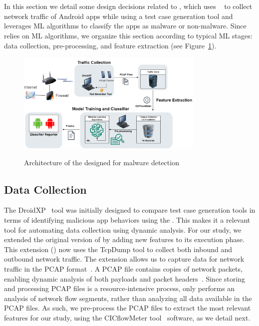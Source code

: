 \section{\droidxpflow}\label{sec:droidxpflow}

In this section we detail some design decisions
related to \droidxpflow, which uses \droidxp~\cite{DBLP:conf/scam/CostaMCMVBC20} to
collect network traffic of Android apps while
using a test case generation tool and leverages
ML algorithms to classify the
apps as malware or non-malware. Since \droidxpflow
relies on ML algorithms, we organize this section
according to typical ML stages: data collection,
pre-processing, and 
feature extraction (see Figure~\ref{fig:arq}).


\begin{figure}[h]
  \centering
  
    \includegraphics[width=0.80\textwidth]{image/archic.png} \\[\abovecaptionskip]
    
  \caption{Architecture of the \droidxpflow designed for malware detection}\label{fig:arq}
\end{figure}

\subsection{Data Collection}

The DroidXP~\cite{DBLP:conf/scam/CostaMCMVBC20} tool was initially designed to compare test case generation tools in terms of identifying malicious app behaviors using the \mas. This makes it a relevant tool for automating data collection using dynamic analysis. For our study, we extended the original version of \droidxp by adding new features to its execution phase. This extension (\droidxpflow) now uses the TcpDump tool
to collect both inbound and outbound network traffic. The \droidxpflow extension allows us to capture data for network traffic in the PCAP format~\cite{DBLP:conf/iv/UhlarHR21}.
A PCAP file contains copies of network packets, enabling dynamic analysis of both payloads and packet headers~\cite{DBLP:conf/iv/UhlarHR21}. Since storing
and processing PCAP files is a resource-intensive process, \droidxpflow only performs an analysis of network flow segments, rather than analyzing all data available in the PCAP
files. As such, we pre-process the PCAP files to extract the most relevant features for our study, using the CICflowMeter tool~\cite{DBLP:conf/icissp/LashkariDMG17} software,
as we detail next.


